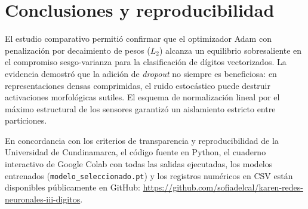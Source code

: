 \documentclass[12pt,letterpaper]{article}
\begin{document}
\section{Conclusiones y reproducibilidad}
El estudio comparativo permitió confirmar que el optimizador Adam con penalización por decaimiento de pesos ($L_2$) alcanza un equilibrio sobresaliente en el compromiso sesgo-varianza para la clasificación de dígitos vectorizados. La evidencia demostró que la adición de \textit{dropout} no siempre es beneficiosa: en representaciones densas comprimidas, el ruido estocástico puede destruir activaciones morfológicas sutiles. El esquema de normalización lineal por el máximo estructural de los sensores garantizó un aislamiento estricto entre particiones.

En concordancia con los criterios de transparencia y reproducibilidad de la Universidad de Cundinamarca, el código fuente en Python, el cuaderno interactivo de Google Colab con todas las salidas ejecutadas, los modelos entrenados (\texttt{modelo\_seleccionado.pt}) y los registros numéricos en CSV están disponibles públicamente en GitHub: \url{https://github.com/sofiadelcal/karen-redes-neuronales-iii-digitos}.
\end{document}
